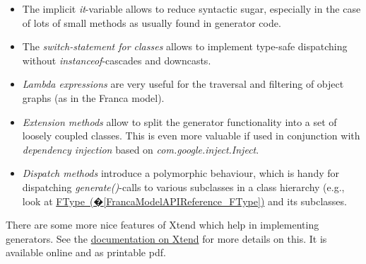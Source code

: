 \documentclass[a4paper,10pt]{scrreprt}
\newlength{\XdocItemIndent}
\begin{document}
\setlength{\XdocItemIndent}{\textwidth}
\begin{itemize}
\addtolength{\XdocItemIndent}{-2.5em}
\item \begin{minipage}[t]{\XdocItemIndent}
The implicit \textit{it}-variable allows to reduce syntactic sugar, especially in the
	     case of lots of small methods as usually found in generator code.

\end{minipage}
\item \begin{minipage}[t]{\XdocItemIndent}
The \textit{switch-statement for classes} allows to implement type-safe dispatching
	     without \textit{instanceof}-cascades and downcasts.

\end{minipage}
\item \begin{minipage}[t]{\XdocItemIndent}
\textit{Lambda expressions} are very useful for the traversal and filtering of 
	     object graphs (as in the Franca model).

\end{minipage}
\item \begin{minipage}[t]{\XdocItemIndent}
\textit{Extension methods} allow to split the generator functionality into a set
	     of loosely coupled classes. This is even more valuable if used in conjunction
	     with \textit{dependency injection} based on \textit{com.google.inject.Inject}.

\end{minipage}
\item \begin{minipage}[t]{\XdocItemIndent}
\textit{Dispatch methods} introduce a polymorphic behaviour, which is handy for dispatching
	     \textit{generate()}-calls to various subclasses in a class hierarchy
	     (e.g., look at \hyperref[FrancaModelAPIReference_FType]{FType~(�\ref*{FrancaModelAPIReference_FType})} and its subclasses.

\end{minipage}
\end{itemize}
\addtolength{\XdocItemIndent}{2.5em}

There are some more nice features of Xtend which help in implementing generators. 
See the \href{http://xtend-lang.org}{documentation on Xtend} for more details on this.
It is available online and as printable pdf. 
\end{document}
